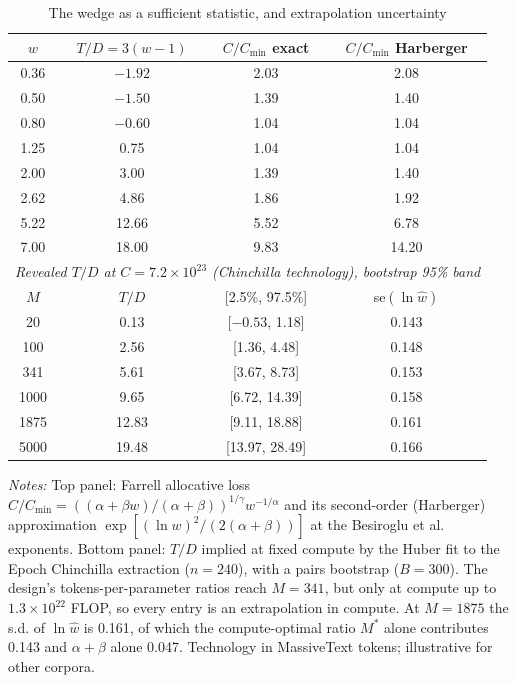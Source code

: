 \begin{table}[htbp]
\centering
\small
\begin{threeparttable}
\caption{The wedge as a sufficient statistic, and extrapolation uncertainty}
\label{tab:m7_wedge}
\begin{tabular}{@{}cccc@{}}
\toprule
$w$ & $T/D=3(w-1)$ & $C/C_{\min}$ exact & $C/C_{\min}$ Harberger \\
\midrule
0.36 & $-1.92$ & 2.03 & 2.08 \\
0.50 & $-1.50$ & 1.39 & 1.40 \\
0.80 & $-0.60$ & 1.04 & 1.04 \\
1.25 & 0.75 & 1.04 & 1.04 \\
2.00 & 3.00 & 1.39 & 1.40 \\
2.62 & 4.86 & 1.86 & 1.92 \\
5.22 & 12.66 & 5.52 & 6.78 \\
7.00 & 18.00 & 9.83 & 14.20 \\
\midrule
\multicolumn{4}{l}{\textit{Revealed $T/D$ at $C=7.2\times10^{23}$ (Chinchilla technology), bootstrap 95\% band}} \\
$M$ & $T/D$ & [2.5\%, 97.5\%] & se$(\ln\hat w)$ \\
20 & 0.13 & [$-0.53$, 1.18] & 0.143 \\
100 & 2.56 & [1.36, 4.48] & 0.148 \\
341 & 5.61 & [3.67, 8.73] & 0.153 \\
1000 & 9.65 & [6.72, 14.39] & 0.158 \\
1875 & 12.83 & [9.11, 18.88] & 0.161 \\
5000 & 19.48 & [13.97, 28.49] & 0.166 \\
\bottomrule
\end{tabular}
\begin{tablenotes}\footnotesize
\item \textit{Notes:} Top panel: Farrell allocative loss $C/C_{\min}=((\alpha+\beta w)/(\alpha+\beta))^{1/\gamma}w^{-1/\alpha}$ and its second-order (Harberger) approximation $\exp[(\ln w)^2/(2(\alpha+\beta))]$ at the Besiroglu et al. exponents. Bottom panel: $T/D$ implied at fixed compute by the Huber fit to the Epoch Chinchilla extraction ($n=240$), with a pairs bootstrap ($B=300$). The design's tokens-per-parameter ratios reach $M=341$, but only at compute up to $1.3\times10^{22}$ FLOP, so every entry is an extrapolation in compute. At $M=1875$ the s.d. of $\ln\hat w$ is 0.161, of which the compute-optimal ratio $M^*$ alone contributes 0.143 and $\alpha+\beta$ alone 0.047. Technology in MassiveText tokens; illustrative for other corpora.
\end{tablenotes}
\end{threeparttable}
\end{table}
